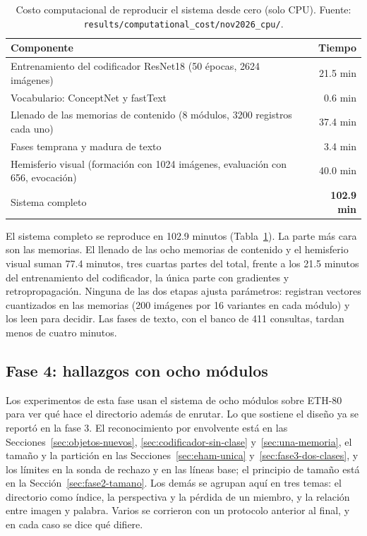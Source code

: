 \begin{table}[H]
    \centering
    \caption[Costo computacional de reproducir el sistema desde cero]{Costo computacional de reproducir el sistema desde cero (solo CPU).
    Fuente: \texttt{results/computational\_cost/nov2026\_cpu/}.}
    \label{tab:costo}
    \small
    \begin{tabular}{lr}
        \toprule
        Componente & Tiempo \\
        \midrule
        Entrenamiento del codificador ResNet18 (50 épocas, 2624 imágenes) & 21.5 min \\
        Vocabulario: ConceptNet y fastText & 0.6 min \\
        Llenado de las memorias de contenido (8 módulos, 3200 registros cada uno) & 37.4 min \\
        Fases temprana y madura de texto & 3.4 min \\
        Hemisferio visual (formación con 1024 imágenes, evaluación con 656, evocación) & 40.0 min \\
        \midrule
        Sistema completo & \textbf{102.9 min} \\
        \bottomrule
    \end{tabular}
\end{table}

El sistema completo se reproduce en 102.9 minutos (Tabla~\ref{tab:costo}).
La parte más cara son las memorias.
El llenado de las ocho memorias de contenido y el hemisferio visual suman 77.4 minutos,
tres cuartas partes del total, frente a los 21.5 minutos del entrenamiento del
codificador, la única parte con gradientes y retropropagación.
Ninguna de las dos etapas ajusta parámetros: registran vectores cuantizados en las
memorias (200 imágenes por 16 variantes en cada módulo) y los leen para decidir.
Las fases de texto, con el banco de 411 consultas, tardan menos de cuatro minutos.

\subsection{Fase 4: hallazgos con ocho módulos}
\label{sec:fase4-resultados}

Los experimentos de esta fase usan el sistema de ocho módulos sobre ETH-80 para ver qué
hace el directorio además de enrutar.
Lo que sostiene el diseño ya se reportó en la fase 3.
El reconocimiento por envolvente está en las Secciones~\ref{sec:objetos-nuevos},
\ref{sec:codificador-sin-clase} y~\ref{sec:una-memoria}, el tamaño y la partición en
las Secciones~\ref{sec:eham-unica} y~\ref{sec:fase3-dos-clases}, y los límites en la
sonda de rechazo y en las líneas base; el principio de tamaño está en la
Sección~\ref{sec:fase2-tamano}.
Los demás se agrupan aquí en tres temas: el directorio como índice, la perspectiva y la
pérdida de un miembro, y la relación entre imagen y palabra.
Varios se corrieron con un protocolo anterior al final, y en cada caso se dice qué
difiere.

